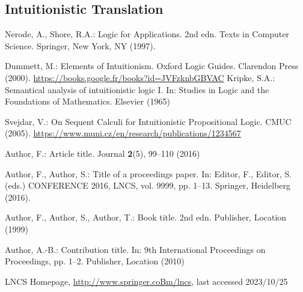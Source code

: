 \documentclass[runningheads]{llncs}
\begin{document}
\subsection{Intuitionistic Translation}





%
%
%
% 
% 
%
\begin{thebibliography}{8}

    Nerode, A., Shore, R.A.: Logic for Applications. 2nd edn. Texts in Computer Science. Springer, New York, NY (1997). 
    
    Dummett, M.: Elements of Intuitionism. Oxford Logic Guides. Clarendon Press (2000). \url{https://books.google.fr/books?id=JVFzknbGBVAC}
    Kripke, S.A.: Semantical analysis of intuitionistic logic I. In: Studies in Logic and the Foundations of Mathematics. Elsevier (1965)


    Svejdar, V.: On Sequent Calculi for Intuitionistic Propositional Logic. CMUC (2005). \url{https://www.muni.cz/en/research/publications/1234567}

Author, F.: Article title. Journal \textbf{2}(5), 99--110 (2016)

Author, F., Author, S.: Title of a proceedings paper. In: Editor,
F., Editor, S. (eds.) CONFERENCE 2016, LNCS, vol. 9999, pp. 1--13.
Springer, Heidelberg (2016). 

Author, F., Author, S., Author, T.: Book title. 2nd edn. Publisher,
Location (1999)

Author, A.-B.: Contribution title. In: 9th International Proceedings
on Proceedings, pp. 1--2. Publisher, Location (2010)


LNCS Homepage, \url{http://www.springer.coBm/lncs}, last accessed 2023/10/25
\end{thebibliography}
\end{document}
